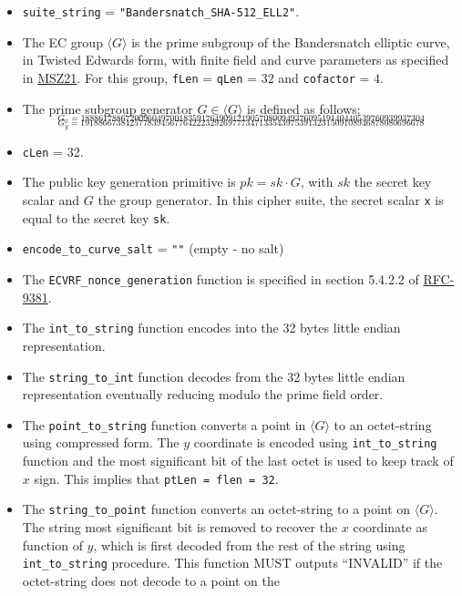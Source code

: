\documentclass[
]{article}
\begin{document}
\begin{itemize}
\item
  \texttt{suite\_string} = \texttt{"Bandersnatch\_SHA-512\_ELL2"}.
\item
  The EC group \(\langle G \rangle\) is the prime subgroup of the
  Bandersnatch elliptic curve, in Twisted Edwards form, with finite
  field and curve parameters as specified in
  \href{https://eprint.iacr.org/2021/1152}{MSZ21}. For this group,
  \texttt{fLen} = \texttt{qLen} = \(32\) and \texttt{cofactor} = \(4\).
\item
  The prime subgroup generator \(G \in \langle G \rangle\) is defined as
  follows:
  \[_{G_x = 18886178867200960497001835917649091219057080094937609519140440539760939937304}\]
  \[_{G_y = 19188667384257783945677642223292697773471335439753913231509108946878080696678}\]
\item
  \texttt{cLen} = 32.
\item
  The public key generation primitive is \(pk = sk \cdot G\), with
  \(sk\) the secret key scalar and \(G\) the group generator. In this
  cipher suite, the secret scalar \texttt{x} is equal to the secret key
  \texttt{sk}.
\item
  \texttt{encode\_to\_curve\_salt} = \texttt{""} (empty - no salt)
\item
  The \texttt{ECVRF\_nonce\_generation} function is specified in section
  5.4.2.2 of \href{https://datatracker.ietf.org/doc/rfc9381}{RFC-9381}.
\item
  The \texttt{int\_to\_string} function encodes into the 32 bytes little
  endian representation.
\item
  The \texttt{string\_to\_int} function decodes from the 32 bytes little
  endian representation eventually reducing modulo the prime field
  order.
\item
  The \texttt{point\_to\_string} function converts a point in
  \(\langle G \rangle\) to an octet-string using compressed form. The
  \(y\) coordinate is encoded using \texttt{int\_to\_string} function
  and the most significant bit of the last octet is used to keep track
  of \(x\) sign. This implies that \texttt{ptLen\ =\ flen\ =\ 32}.
\item
  The \texttt{string\_to\_point} function converts an octet-string to a
  point on \(\langle G \rangle\). The string most significant bit is
  removed to recover the \(x\) coordinate as function of \(y\), which is
  first decoded from the rest of the string using
  \texttt{int\_to\_string} procedure. This function MUST outputs
  ``INVALID'' if the octet-string does not decode to a point on the

\end{itemize}
\end{document}
